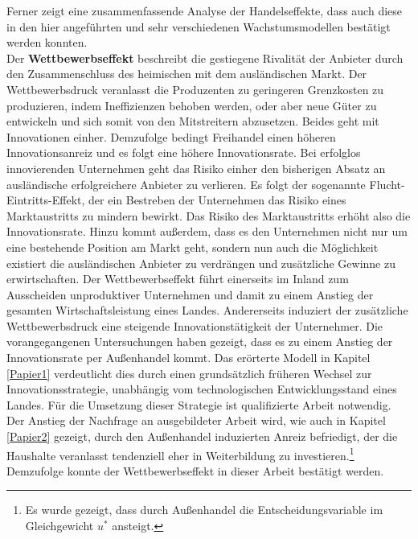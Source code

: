 Ferner zeigt eine zusammenfassende Analyse der Handelseffekte, dass auch diese in den hier angef{\"u}hrten und sehr verschiedenen Wachstumsmodellen best{\"a}tigt werden konnten.\\
Der \textbf{Wettbewerbseffekt} beschreibt die gestiegene Rivalit{\"a}t der Anbieter durch den Zusammenschluss des heimischen mit dem ausl{\"a}ndischen Markt. Der Wettbewerbsdruck veranlasst die Produzenten zu geringeren Grenzkosten zu produzieren, indem Ineffizienzen behoben werden, oder aber neue G{\"u}ter zu entwickeln und sich somit von den Mitstreitern abzusetzen. Beides geht mit Innovationen einher. Demzufolge bedingt Freihandel einen h{\"o}heren Innovationsanreiz und es folgt eine h{\"o}here Innovationsrate. \newline Bei erfolglos innovierenden Unternehmen geht das Risiko einher den bisherigen Absatz an ausl{\"a}ndische erfolgreichere Anbieter zu verlieren. Es folgt der sogenannte Flucht-Eintritts-Effekt, der ein Bestreben der Unternehmen das Risiko eines Marktaustritts zu mindern bewirkt. Das Risiko des Marktaustritts erh{\"o}ht also die Innovationsrate. Hinzu kommt au{\ss}erdem, dass es den Unternehmen nicht nur um eine bestehende Position am Markt geht, sondern nun auch die M{\"o}glichkeit existiert die ausl{\"a}ndischen Anbieter zu verdr{\"a}ngen und zus{\"a}tzliche Gewinne zu erwirtschaften. \newline Der Wettbewerbseffekt f{\"u}hrt einerseits im Inland zum Ausscheiden unproduktiver Unternehmen und damit zu einem Anstieg der gesamten Wirtschaftsleistung eines Landes. Andererseits induziert der zus{\"a}tzliche Wettbewerbsdruck eine steigende Innovationst{\"a}tigkeit der Unternehmer. \newline 
Die vorangegangenen Untersuchungen haben gezeigt, dass es zu einem Anstieg der Innovationsrate per Au{\ss}enhandel kommt. Das er{\"o}rterte Modell in Kapitel \ref{Papier1} verdeutlicht dies durch einen grunds{\"a}tzlich fr{\"u}heren Wechsel zur Innovationsstrategie, unabh{\"a}ngig vom technologischen Entwicklungsstand eines Landes. F{\"u}r die Umsetzung dieser Strategie ist qualifizierte Arbeit notwendig. Der Anstieg der Nachfrage an ausgebildeter Arbeit wird, wie auch in Kapitel \ref{Papier2} gezeigt, durch den Au{\ss}enhandel induzierten Anreiz befriedigt, der die Haushalte veranlasst tendenziell eher in Weiterbildung zu investieren.\footnote{Es wurde gezeigt, dass durch Au{\ss}enhandel die Entscheidungsvariable im Gleichgewicht $u^*$ ansteigt.} Demzufolge konnte der Wettbewerbseffekt in dieser Arbeit best{\"a}tigt werden. \newline
